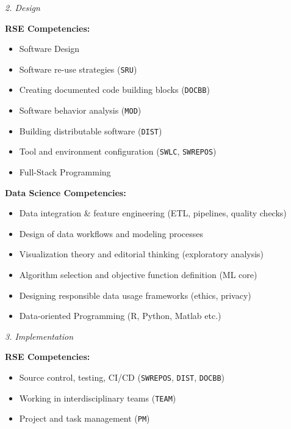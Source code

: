 \documentclass[
        english,biblatex
    ]{lni}
\providecommand{\tightlist}{%
    \setlength{\itemsep}{0pt}\setlength{\parskip}{0pt}}
\begin{document}
    \emph{2. Design}

    \textbf{RSE Competencies:}

    \begin{itemize}
    \tightlist
    \item
      Software Design
    \item
      Software re-use strategies (\texttt{SRU})
    \item
      Creating documented code building blocks (\texttt{DOCBB})
    \item
      Software behavior analysis (\texttt{MOD})
    \item
      Building distributable software (\texttt{DIST})
    \item
      Tool and environment configuration (\texttt{SWLC},
      \texttt{SWREPOS})
    \item
      Full-Stack Programming
    \end{itemize}

    \textbf{Data Science Competencies:}

    \begin{itemize}
    \tightlist
    \item
      Data integration \& feature engineering (ETL, pipelines, quality
      checks)
    \item
      Design of data workflows and modeling processes
    \item
      Visualization theory and editorial thinking (exploratory analysis)
    \item
      Algorithm selection and objective function definition (ML core)
    \item
      Designing responsible data usage frameworks (ethics, privacy)
    \item
      Data-oriented Programming (R, Python, Matlab etc.)
    \end{itemize}

    \emph{3. Implementation}

    \textbf{RSE Competencies:}

    \begin{itemize}
    \tightlist
    \item
      Source control, testing, CI/CD (\texttt{SWREPOS}, \texttt{DIST},
      \texttt{DOCBB})
    \item
      Working in interdisciplinary teams (\texttt{TEAM})
    \item
      Project and task management (\texttt{PM})
    \end{itemize}
\end{document}
